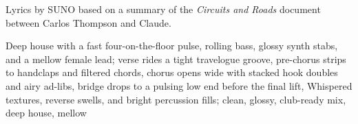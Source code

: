 
\begin{notes}
Lyrics by SUNO based on a summary of the \emph{Circuits and Roads} document between Carlos Thompson and Claude.
\end{notes}
\begin{style}
Deep house with a fast four-on-the-floor pulse, rolling bass, glossy synth stabs, and a mellow female lead; verse rides a tight travelogue groove, pre-chorus strips to handclaps and filtered chords, chorus opens wide with stacked hook doubles and airy ad-libs, bridge drops to a pulsing low end before the final lift, Whispered textures, reverse swells, and bright percussion fills; clean, glossy, club-ready mix, deep house, mellow
\end{style}
